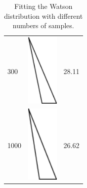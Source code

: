 \begin{table}
\begin{tabular}{l l l}
300 & \includegraphics[width=0.6in]{output/1.models/samples_watson/watson_est_300.png} & 28.11 \\ 
1000 & \includegraphics[width=0.6in]{output/1.models/samples_watson/watson_est_1000.png} & 26.62 \\ 
\end{tabular}
\caption{Fitting the Watson distribution with different numbers of samples.}
\end{table}

